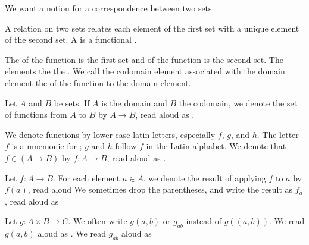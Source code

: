 
\sbasic








\sstart
{}


We want a notion for a correspondence
between two sets.


A  relation
on two sets relates each element of the
first set with a unique element of the
second set.
A  is a
functional .

The  of the function is
the first set and 
of the function is the second set.
The 
 elements
 the
 
the .
We call the codomain element associated
with the domain element the
 of
the function to the domain element.


Let $A$ and $B$ be sets.
If $A$ is the domain and $B$ the codomain,
we denote the set of functions from $A$ to
$B$ by $A \to B$, read aloud as .

We denote functions by lower case latin letters,
especially $f$, $g$, and $h$.
The letter $f$ is a mnemonic for
;
$g$ and $h$ follow $f$ in the Latin alphabet.
We denote that $f \in (A \to B)$ by
$f: A \to B$, read aloud as
.

Let $f: A \to B$.
For each element $a \in A$, we denote the
result of applying
$f$ to $a$ by $f(a)$, read aloud
We sometimes drop the parentheses, and write
the result as $f_a$, read aloud as

Let $g: A \times B \to C$.
We often write $g(a,b)$ or $g_{ab}$
instead of $g((a,b))$.
We read $g(a, b)$ aloud as
.
We read $g_{ab}$ aloud as
\strats
